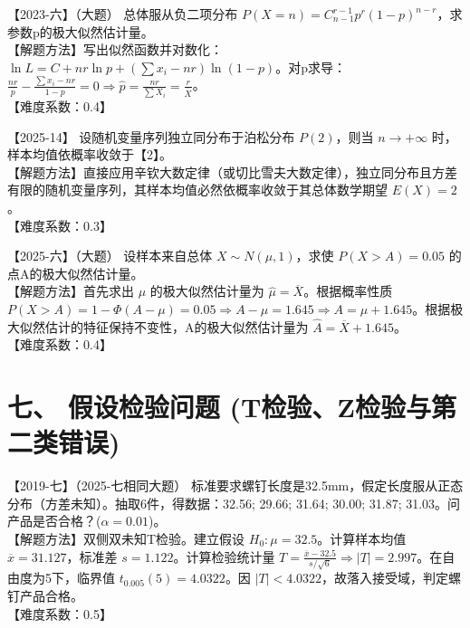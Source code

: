 \documentclass[zihao=4, a4paper, fontset=mac]{ctexart}
\begin{document}
\par\vspace{\baselineskip}

【2023-六】（大题） 总体服从负二项分布 $P(X=n)=C_{n-1}^{r-1}p^r(1-p)^{n-r}$，求参数p的极大似然估计量。\\
【解题方法】写出似然函数并对数化：$\ln L = C + nr\ln p + (\sum x_i - nr)\ln(1-p)$。对p求导：$\frac{nr}{p} - \frac{\sum x_i - nr}{1-p} = 0 \Rightarrow \widehat{p} = \frac{nr}{\sum X_i} = \frac{r}{\overline{X}}$。\\
【难度系数：0.4】

\par\vspace{\baselineskip}

【2025-14】 设随机变量序列独立同分布于泊松分布 $P(2)$，则当 $n\rightarrow+\infty$ 时，样本均值依概率收敛于【2】。\\
【解题方法】直接应用辛钦大数定律（或切比雪夫大数定律），独立同分布且方差有限的随机变量序列，其样本均值必然依概率收敛于其总体数学期望 $E(X)=2$。\\
【难度系数：0.3】

\par\vspace{\baselineskip}

【2025-六】（大题） 设样本来自总体 $X\sim N(\mu,1)$，求使 $P(X>A)=0.05$ 的点A的极大似然估计量。\\
【解题方法】首先求出 $\mu$ 的极大似然估计量为 $\widehat{\mu}=\overline{X}$。根据概率性质 $P(X>A)=1-\Phi(A-\mu)=0.05 \Rightarrow A-\mu = 1.645 \Rightarrow A=\mu+1.645$。根据极大似然估计的特征保持不变性，A的极大似然估计量为 $\widehat{A}=\overline{X}+1.645$。\\
【难度系数：0.4】


\section*{七、 假设检验问题 (T检验、Z检验与第二类错误)}

【2019-七】（2025-七相同大题） 标准要求螺钉长度是32.5mm，假定长度服从正态分布（方差未知）。抽取6件，得数据：32.56; 29.66; 31.64; 30.00; 31.87; 31.03。问产品是否合格？($\alpha=0.01$)。\\
【解题方法】双侧双未知T检验。建立假设 $H_0:\mu=32.5$。计算样本均值 $\overline{x}=31.127$，标准差 $s=1.122$。计算检验统计量 $T=\frac{\overline{x}-32.5}{s/\sqrt{6}} \Rightarrow |T|=2.997$。在自由度为5下，临界值 $t_{0.005}(5)=4.0322$。因 $|T|<4.0322$，故落入接受域，判定螺钉产品合格。\\
【难度系数：0.5】
\end{document}
